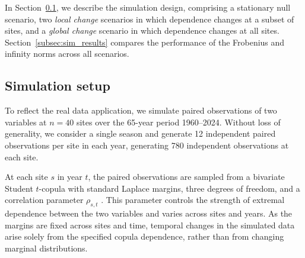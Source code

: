 \documentclass[APA,STIX1COL]{WileyNJD-v2}
\begin{document}
In Section~\ref{subsec:sim_setup}, we describe the simulation design, comprising a stationary null scenario, two \textit{local change} scenarios in which dependence changes at a subset of sites, and a \textit{global change} scenario in which dependence changes at all sites. Section~\ref{subsec:sim_results} compares the performance of the Frobenius and infinity norms across all scenarios.

\subsection{Simulation setup}
\label{subsec:sim_setup}


To reflect the real data application, we simulate paired observations of two variables at $n=40$ sites over the 65-year period 1960--2024. 
Without loss of generality, we consider a single season and generate 12 independent paired observations per site in each year, generating 780 independent observations at each site.

At each site $s$ in year $t$, the paired observations are sampled from a bivariate Student $t$-copula with standard Laplace margins, three degrees of freedom, and a correlation parameter $\rho_{s,t}$ \citep{Demarta2007-ap}. This parameter controls the strength of extremal dependence between the two variables and varies across sites and years. 
As the margins are fixed across sites and time, temporal changes in the simulated data arise solely from the specified copula dependence, rather than from changing marginal distributions.
\end{document}
